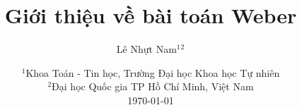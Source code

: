 \documentclass[a4paper]{report}
\title{Giới thiệu về bài toán Weber}
\author{Lê Nhựt Nam$^1$$^2$}
\date{
    $^1$Khoa Toán - Tin học, Trường Đại học Khoa học Tự nhiên\\%
    $^2$Đại học Quốc gia TP Hồ Chí Minh, Việt Nam\\%
    \vfill
    \today
}
\begin{document}
    \maketitle
    \tableofcontents

    
    

    \nocite{*}
\end{document}
